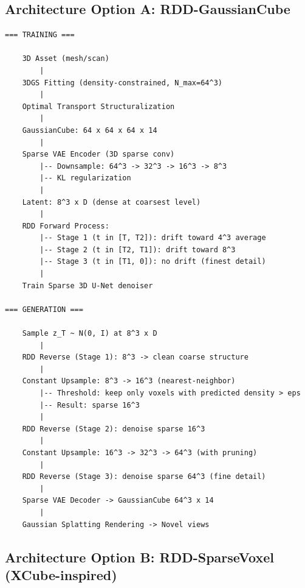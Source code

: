 \documentclass[11pt, a4paper]{article}
\begin{document}
\subsection{Architecture Option A: RDD-GaussianCube}

\begin{lstlisting}[style=flowchart, caption={RDD-GaussianCube Architecture}]
=== TRAINING ===

    3D Asset (mesh/scan)
        |
    3DGS Fitting (density-constrained, N_max=64^3)
        |
    Optimal Transport Structuralization
        |
    GaussianCube: 64 x 64 x 64 x 14
        |
    Sparse VAE Encoder (3D sparse conv)
        |-- Downsample: 64^3 -> 32^3 -> 16^3 -> 8^3
        |-- KL regularization
        |
    Latent: 8^3 x D (dense at coarsest level)
        |
    RDD Forward Process:
        |-- Stage 1 (t in [T, T2]): drift toward 4^3 average
        |-- Stage 2 (t in [T2, T1]): drift toward 8^3 
        |-- Stage 3 (t in [T1, 0]): no drift (finest detail)
        |
    Train Sparse 3D U-Net denoiser

=== GENERATION ===

    Sample z_T ~ N(0, I) at 8^3 x D
        |
    RDD Reverse (Stage 1): 8^3 -> clean coarse structure
        |
    Constant Upsample: 8^3 -> 16^3 (nearest-neighbor)
        |-- Threshold: keep only voxels with predicted density > eps
        |-- Result: sparse 16^3 
        |
    RDD Reverse (Stage 2): denoise sparse 16^3
        |
    Constant Upsample: 16^3 -> 32^3 -> 64^3 (with pruning)
        |
    RDD Reverse (Stage 3): denoise sparse 64^3 (fine detail)
        |
    Sparse VAE Decoder -> GaussianCube 64^3 x 14
        |
    Gaussian Splatting Rendering -> Novel views
\end{lstlisting}

\subsection{Architecture Option B: RDD-SparseVoxel (XCube-inspired)}
\end{document}
